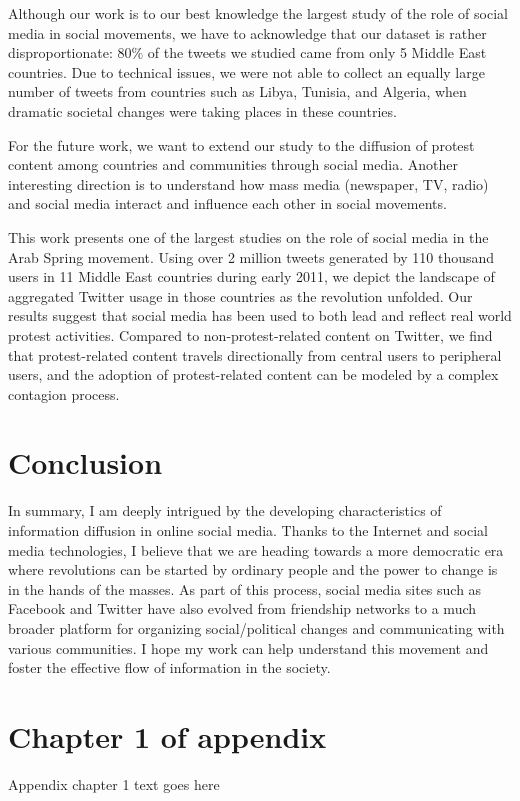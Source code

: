 \documentclass[phd,tocprelim]{cornell}
\begin{document}
 Although our work is to our best knowledge the largest study of the role of social media in social movements, we have to acknowledge that our dataset is rather disproportionate: $80\%$ of the tweets we studied came from only 5 Middle East countries. Due to technical issues, we were not able to collect an equally large number of tweets from countries such as Libya, Tunisia, and Algeria, when dramatic societal changes were taking places in these countries.

For the future work, we want to extend our study to the diffusion of protest content among countries and communities through social media. Another interesting direction is to understand how mass media (newspaper, TV, radio) and social media interact and influence each other in social movements.

This work presents one of the largest studies on the role of social media in the Arab Spring movement. Using over 2 million tweets generated by 110 thousand users in 11 Middle East countries during early 2011, we depict the landscape of aggregated Twitter usage in those countries as the revolution unfolded. Our results suggest that social media has been used to both lead and reflect real world protest activities. Compared to non-protest-related content on Twitter, we find that protest-related content travels directionally from central users to peripheral users, and the adoption of protest-related content can be modeled by a complex contagion process. 

\chapter{Conclusion}
    In summary, I am deeply intrigued by the developing characteristics of information diffusion in online social media. Thanks to the Internet and social media technologies, I believe that we are heading towards a more democratic era where revolutions can be started by ordinary people and the power to change is in the hands of the masses. As part of this process, social media sites such as Facebook and Twitter have also evolved from friendship networks to a much broader platform for organizing social/political changes and communicating with various communities. I hope my work can help understand this movement and foster the effective flow of information in the society.


\appendix
\chapter{Chapter 1 of appendix}
Appendix chapter 1 text goes here


\end{document}

